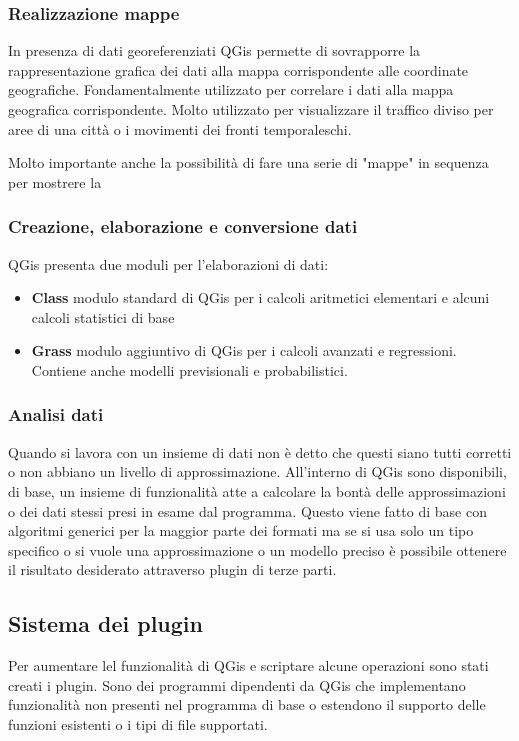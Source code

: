 \subsubsection{Realizzazione mappe}
In presenza di dati georeferenziati QGis permette di sovrapporre la rappresentazione grafica dei dati alla mappa corrispondente alle coordinate geografiche.
Fondamentalmente utilizzato per correlare i dati alla mappa geografica corrispondente. Molto utilizzato per visualizzare il traffico diviso per aree di una città o i movimenti dei fronti temporaleschi.

Molto importante anche la possibilità di fare una serie di "mappe" in sequenza per mostrere la

\subsubsection{Creazione, elaborazione e conversione dati}
QGis presenta due moduli per l'elaborazioni di dati:
\begin{itemize}
	\item \textbf{Class} modulo standard di QGis per i calcoli aritmetici elementari e alcuni calcoli statistici di base
	\item \textbf{Grass} modulo aggiuntivo di QGis per i calcoli avanzati e regressioni. Contiene anche modelli previsionali e probabilistici.
\end{itemize}

\subsubsection{Analisi dati}
Quando si lavora con un insieme di dati non è detto che questi siano tutti corretti o non abbiano un livello di approssimazione.
All'interno di QGis sono disponibili, di base, un insieme di funzionalità atte a calcolare la bontà delle approssimazioni o dei dati stessi presi in esame dal programma.
Questo viene fatto di base con algoritmi generici per la maggior parte dei formati ma se si usa solo un tipo specifico o si vuole una approssimazione o un modello preciso è possibile ottenere il risultato desiderato attraverso plugin di terze parti.

\subsection{Sistema dei plugin}
Per aumentare lel funzionalità di QGis e scriptare alcune operazioni sono stati creati i plugin.
Sono dei programmi dipendenti da QGis che implementano funzionalità non presenti nel programma di base o estendono il supporto delle funzioni esistenti o i tipi di file supportati.

